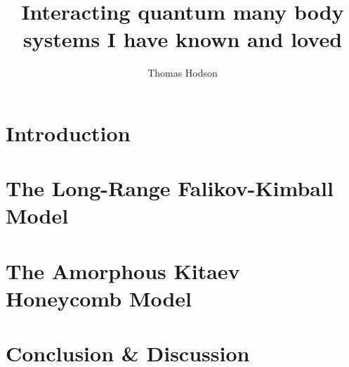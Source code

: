 \documentclass[a4paper,12pt]{report}
\begin{document}
\title{\LARGE {\bf Interacting quantum many body systems I have known and loved}\\
 \vspace*{6mm}
}

\author{Thomas Hodson}

\normallinespacing
\maketitle

\preface




% 

\body
\chapter{Introduction}


\chapter{The Long-Range Falikov-Kimball Model}


\chapter{The Amorphous Kitaev Honeycomb Model}




\chapter{Conclusion \& Discussion}
\appendix
    

% 
% 
\printbibliography
\end{document}
